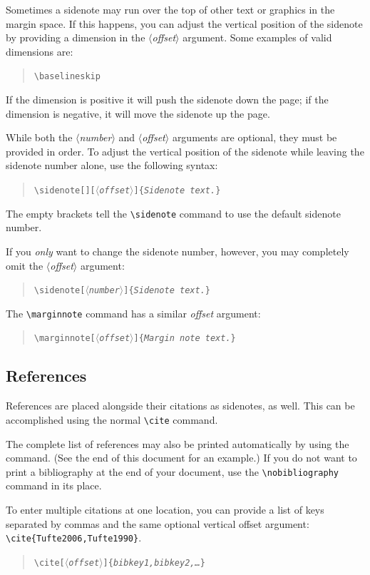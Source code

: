 \documentclass{tufte-handout}
\newcommand{\doccmd}[1]{\texttt{\textbackslash#1}}%
\newcommand{\docopt}[1]{\ensuremath{\langle}\textrm{\textit{#1}}\ensuremath{\rangle}}%
\newcommand{\docarg}[1]{\textrm{\textit{#1}}}%
\newenvironment{docspec}{\begin{quote}\noindent}{\end{quote}}%
\begin{document}
Sometimes a sidenote may run over the top of other text or graphics in the
margin space.  If this happens, you can adjust the vertical position of the
sidenote by providing a dimension in the \docopt{offset} argument.  Some
examples of valid dimensions are:
\begin{docspec}
  \ttfamily 1.0in \qquad 2.54cm \qquad 254mm \Verb|\baselineskip|
\end{docspec}
If the dimension is positive it will push the sidenote down the page; if the
dimension is negative, it will move the sidenote up the page.

While both the \docopt{number} and \docopt{offset} arguments are optional, they
must be provided in order.  To adjust the vertical position of the sidenote
while leaving the sidenote number alone, use the following syntax:
\begin{docspec}
  \doccmd{sidenote[][\docopt{offset}]\{\docarg{Sidenote text.}\}}
\end{docspec}
The empty brackets tell the \Verb|\sidenote| command to use the default
sidenote number.

If you \emph{only} want to change the sidenote number, however, you may
completely omit the \docopt{offset} argument:
\begin{docspec}
  \doccmd{sidenote[\docopt{number}]\{\docarg{Sidenote text.}\}}
\end{docspec}

The \Verb|\marginnote| command has a similar \docarg{offset} argument:
\begin{docspec}
  \doccmd{marginnote[\docopt{offset}]\{\docarg{Margin note text.}\}}
\end{docspec}

\subsection{References}
References are placed alongside their citations as sidenotes,
as well.  This can be accomplished using the normal \Verb|\cite|
command.

The complete list of references may also be printed automatically by using
the \Verb|| command.  (See the end of this document for an
example.)  If you do not want to print a bibliography at the end of your
document, use the \Verb|\nobibliography| command in its place.  

To enter multiple citations at one location,\cite{Tufte2006,Tufte1990} you can
provide a list of keys separated by commas and the same optional vertical
offset argument: \Verb|\cite{Tufte2006,Tufte1990}|.  
\begin{docspec}
  \doccmd{cite[\docopt{offset}]\{\docarg{bibkey1,bibkey2,\ldots}\}}
\end{docspec}
\end{document}
